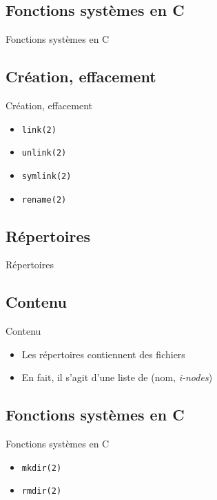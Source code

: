 \def\sectitle{Fonctions systèmes en C}
\subsection{\sectitle}
\begin{frame}[containsverbatim]{\sectitle}
\def\subsectitle{Création, effacement}
\subsection{\subsectitle}
\begin{exampleblock}{\subsectitle}
\begin{itemize}
    \item \verb+link(2)+
    \item \verb+unlink(2)+
    \item \verb+symlink(2)+
    \item \verb+rename(2)+
\end{itemize}
\end{exampleblock}
\end{frame}


\def\sectitle{Répertoires}
\subsection{\sectitle}
\begin{frame}[containsverbatim]{\sectitle}
\def\subsectitle{Contenu}
\subsection{\subsectitle}
\begin{block}{\subsectitle}
\begin{itemize}
    \item Les répertoires contiennent des fichiers
    \item En fait, il s'agit d'une liste de (nom, \textit{i-nodes}) 
\end{itemize}
\end{block}

\def\subsectitle{Fonctions systèmes en C}
\subsection{\subsectitle}
\begin{exampleblock}{\subsectitle}
    \begin{itemize}
        \item \verb+mkdir(2)+
        \item \verb+rmdir(2)+
    \end{itemize}
\end{exampleblock}
\end{frame}

